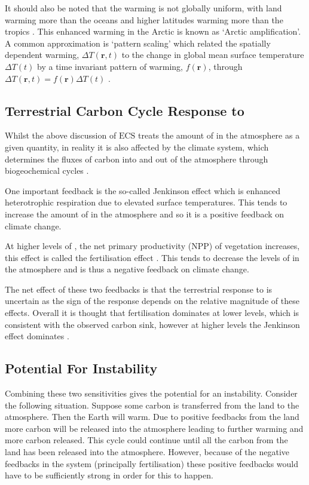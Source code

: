It should also be noted that the warming is not globally uniform, with land warming more than the oceans \parencite{Morice2021} and higher latitudes warming more than the tropics \parencite{Serreze2011}.
This enhanced warming in the Arctic is known as `Arctic amplification'. A common approximation is `pattern scaling' which related the spatially dependent warming, $\Delta T(\bm{r},t)$
to the change in global mean surface temperature $\Delta T(t)$ by a time invariant pattern of warming, $f(\bm{r})$,
through $\Delta T(\bm{r},t) = f(\bm{r}) \Delta T(t)$ \parencite{Huntingford2000a}.



\subsection{Terrestrial Carbon Cycle Response to }
Whilst the above discussion of $\mathrm{ECS}$ treats the amount of  in the atmosphere as a given quantity, in reality it is also affected by the climate
system, which determines the fluxes of carbon into and out of the atmosphere through biogeochemical cycles \parencite{Rothman2014}.

One important feedback is the so-called Jenkinson effect \parencite{Jenkinson1991} which is enhanced heterotrophic respiration due to elevated surface temperatures. This
tends to increase the amount of  in the atmosphere and so it is a positive feedback on climate change.

At higher levels of , the net primary productivity (NPP) of vegetation increases, this effect is called the  fertilisation effect \parencite{Wenzel2016}.
This tends to decrease the levels of  in the atmosphere and is thus a negative feedback on climate change.

The net effect of these two feedbacks is that the terrestrial response to  is uncertain as the sign of the response depends on the relative magnitude of these effects. Overall it
is thought that  fertilisation dominates at lower  levels, which is consistent with the observed carbon sink, however at higher  levels the Jenkinson effect
dominates \parencite{Cox2000,Friedlingstein2006,Arora2020}.

\subsection{Potential For Instability}
Combining these two sensitivities gives the potential for an instability. Consider the following situation. Suppose some carbon is transferred from the land to the atmosphere. Then the Earth
will warm. Due to positive feedbacks from the land more carbon will be released into the atmosphere leading to further warming and more carbon released. This cycle could continue until all the
carbon from the land has been released into the atmosphere. However, because of the negative feedbacks in the system (principally  fertilisation) these positive feedbacks would have to be
sufficiently strong in order for this to happen.

